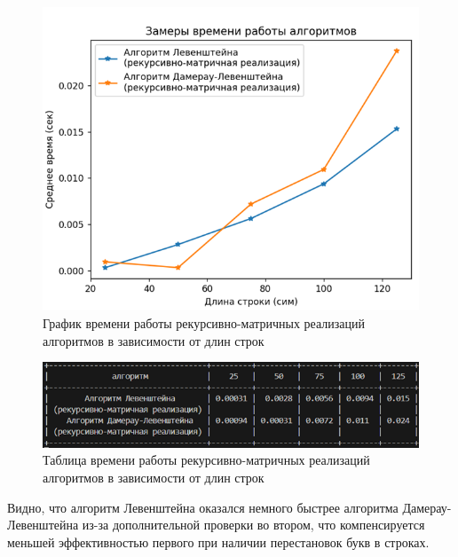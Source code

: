 \documentclass[a4paper,12pt]{article}
\begin{document}
\begin{figure}[H]
    \centering
    \includegraphics[width=1\textwidth]{graph_rec-mat.png}
    \caption{График времени работы рекурсивно-матричных реализаций алгоритмов в зависимости от длин строк}
\end{figure}
\begin{figure}[H]
    \centering
    \includegraphics[width=1\textwidth]{table_rec-mat.png}
    \caption{Таблица времени работы рекурсивно-матричных реализаций алгоритмов в зависимости от длин строк}
\end{figure}

Видно, что алгоритм Левенштейна оказался немного быстрее алгоритма Дамерау-Левенштейна из-за дополнительной проверки во втором, что компенсируется меньшей эффективностью первого при наличии перестановок букв в строках.
\end{document}
